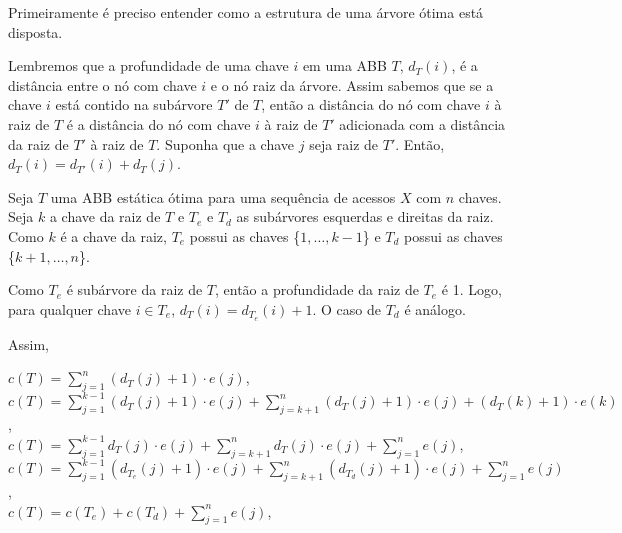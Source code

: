 Primeiramente é preciso entender como a estrutura de uma árvore ótima está disposta.


Lembremos que a profundidade de uma chave $i$ em uma ABB $T$, $d_T(i)$, é a distância entre o nó com chave $i$ e o nó raiz da árvore. Assim sabemos que se a chave $i$ está contido na subárvore $T'$ de $T$, então a distância do nó com chave $i$ à raiz de $T$ é a distância do nó com chave $i$ à raiz de $T'$ adicionada com a distância da raiz de $T'$ à raiz de $T$. Suponha que a chave $j$ seja raiz de $T'$. Então, $d_T(i) = d_{T'}(i) + d_{T}(j)$.

Seja $T$ uma ABB estática ótima para uma sequência de acessos $X$ com $n$ chaves. Seja $k$ a chave da raiz de $T$ e $T_e$ e $T_d$ as subárvores esquerdas e direitas da raiz. Como $k$ é a chave da raiz, $T_e$ possui as chaves \{$1,\ldots,k-1$\} e $T_d$ possui as chaves \{$k+1,\ldots,n$\}. 

Como $T_e$ é subárvore da raiz de $T$, então a profundidade da raiz de $T_e$ é 1. Logo, para qualquer chave $i \in T_e$, $d_T(i) = d_{T_{e}}(i) + 1$. O caso de $T_d$ é análogo. %

Assim,
\begin{center}
  $c(T) = \sum_{j=1}^{n}(d_T(j) + 1)\cdot e(j)$, \\
  $c(T) = \sum_{j=1}^{k-1}(d_T(j) + 1) \cdot e(j) + \sum_{j=k+1}^{n}(d_T(j) + 1)\cdot e(j) + (d_T(k) + 1)\cdot e(k)$, \\
  $c(T) = \sum_{j=1}^{k-1}d_T(j) \cdot e(j) + \sum_{j=k+1}^{n}d_T(j)\cdot e(j) + \sum_{j=1}^{n} e(j)$, \\

  $c(T) = \sum_{j=1}^{k-1}(d_{T_e}(j) + 1)\cdot e(j) + \sum_{j=k+1}^{n}(d_{T_d}(j) + 1)\cdot e(j) + \sum_{j=1}^{n} e(j)$, \\
  $c(T) = c(T_e) + c(T_d) + \sum_{j=1}^{n}e(j)$, \\
\end{center}

